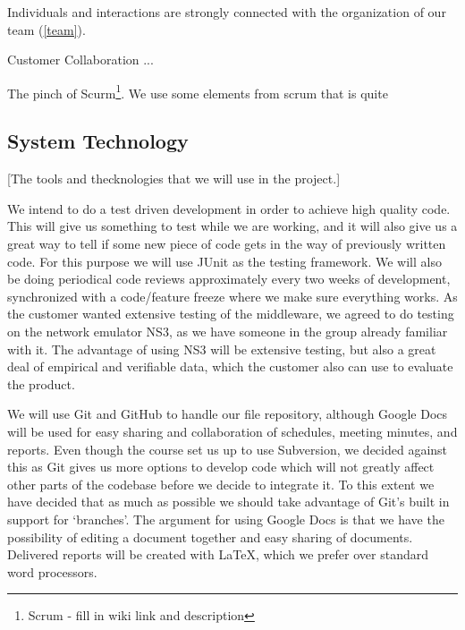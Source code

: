 \documentclass[12pt]{article}
\begin{document}
    Individuals and interactions are strongly connected with the organization of our team (\ref{team}).
    
    Customer Collaboration ...
    
    The pinch of Scurm\footnote
        {Scrum - fill in wiki link and description}. 
    We use some elements from scrum that is quite 



    \subsection{System Technology}\label{tools} [The tools and thecknologies that we will use in the project.]
    
    We  intend to do a test driven development in order to achieve high quality code. This will give us something to test while we are working, and it will also give us a great way to tell if some new piece of code gets in the way of previously written code. For this purpose we will use JUnit as the testing framework. We will also be doing periodical code reviews approximately every two weeks of development, synchronized with a code/feature freeze where we make sure everything works. As the customer wanted extensive testing of the middleware, we agreed to do testing on the network emulator NS3, as we have someone in the group already familiar with it. The advantage of using NS3 will be extensive testing, but also a great deal of empirical and verifiable data, which the customer also can use to evaluate the product.

    We will use Git and GitHub to handle our file repository, although Google Docs will be used for easy sharing and collaboration of schedules, meeting minutes, and reports. Even though the course set us up to use Subversion, we decided against this as Git gives us more options to develop code which will not greatly affect other parts of the codebase before we decide to integrate it. To this extent we have decided that as much as possible we should take advantage of Git’s built in support for ‘branches’. The argument for using Google Docs is that we have the possibility of editing a document together and easy sharing of documents. Delivered reports will be created with LaTeX, which we prefer over standard word processors.
\end{document}
